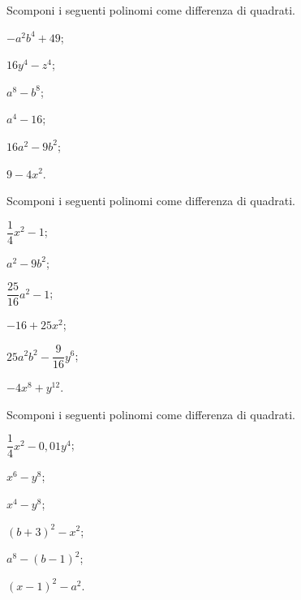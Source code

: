 \begin{esercizio}
\label{ese:13.50}
Scomponi i seguenti polinomi come differenza di quadrati.
\begin{multicols}{3}
\begin{enumeratea}
 \item $-a^{2}b^{4}+49$;
 \item $16y^{4}-z^{4}$;
 \item $a^{8}-b^{8}$;
 \item $a^{4}-16$;
 \item $16a^{2}-9b^{2}$;
 \item $9-4x^{2}$.
\end{enumeratea}
\end{multicols}
\end{esercizio}

\begin{esercizio}
\label{ese:13.51}
Scomponi i seguenti polinomi come differenza di quadrati.
\begin{multicols}{3}
\begin{enumeratea}
 \item $\dfrac{1}{4}x^{2}-1$;
 \item $a^{2}-9b^{2}$;
 \item $\dfrac{25}{16}a^{2}-1$;
 \item $-16+25x^{2}$;
 \item $25a^{2}b^{2}-\dfrac{9}{16}y^{6}$;
 \item $-4x^{8}+y^{12}$.
\end{enumeratea}
\end{multicols}
\end{esercizio}

\begin{esercizio}[\Ast]
\label{ese:13.52}
Scomponi i seguenti polinomi come differenza di quadrati.
\begin{multicols}{3}
\begin{enumeratea}
 \item $\dfrac{1}{4}x^{2}-0,01y^{4}$;
 \item $x^{6}-y^{8}$;
 \item $x^{4}-y^{8}$;
 \item $(b+3)^{2}-x^{2}$;
 \item $a^{8}-(b-1)^{2}$;
 \item $(x-1)^{2}-a^{2}$.
\end{enumeratea}
\end{multicols}
\end{esercizio}

